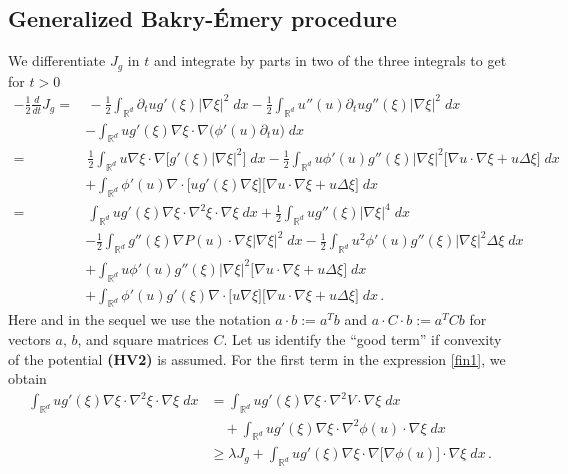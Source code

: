 \documentclass[reqno]{amsart}
\newcommand{\R}{\mathbb{R}}
\begin{document}
\subsection{Generalized Bakry-\'Emery procedure}\label{sec:4.1}
%
We differentiate $J_g$ in $t$ and integrate by parts in two of the three integrals to get for $t>0$
\begin{align}
  -\frac12\frac{d}{dt} J_g 
  =&\, -\frac12\int_{\R^d} \partial_tu g'(\xi)|\nabla\xi|^2 \;dx
  - \frac12\int_{\R^d} u''(u)\partial_t u g''(\xi)|\nabla\xi|^2 \;dx\nonumber\\
  &- \int_{\R^d} ug'(\xi)\nabla\xi\cdot\nabla\big(\phi'(u)\partial_tu\big) \;dx\nonumber\\
  = &\, \frac12\int_{\R^d} u\nabla\xi\cdot\nabla\big[g'(\xi)|\nabla\xi|^2\big] \;dx - \frac12\int_{\R^d} u\phi'(u)g''(\xi)|\nabla\xi|^2\big[\nabla u\cdot\nabla\xi + u\Delta\xi\big] \;dx\nonumber\\
  &+ \int_{\R^d} \phi'(u)\nabla\cdot\big[ug'(\xi)\nabla\xi\big]\big[\nabla u\cdot\nabla\xi + u\Delta\xi\big]\;dx\nonumber\\
  =&\, \int_{\R^d} ug'(\xi)\nabla\xi\cdot\nabla^2\xi \cdot \nabla\xi \;dx
  + \frac12 \int_{\R^d} ug''(\xi)|\nabla\xi|^4 \;dx\nonumber\\
  & -\frac12\int_{\R^d} g''(\xi)\nabla P(u)\cdot\nabla\xi|\nabla\xi|^2 \;dx- \frac12\int_{\R^d} u^2\phi'(u)g''(\xi)|\nabla\xi|^2\Delta\xi \;dx\nonumber\\
  & + \int_{\R^d} u\phi'(u)g''(\xi)|\nabla\xi|^2\big[\nabla u\cdot\nabla\xi + u\Delta\xi\big]\;dx\nonumber\\
& + \int_{\R^d} \phi'(u)g'(\xi)\nabla\cdot\big[u\nabla\xi\big]\big[\nabla u\cdot\nabla\xi + u\Delta\xi\big]\;dx\,.
\label{fin1}  
\end{align}
Here and in the sequel we use the notation $a\cdot b:=a^Tb$ and $a\cdot C \cdot b:=a^T C b$ for vectors $a,\,b$, and square matrices $C$.
Let us identify the ``good term'' if convexity of the potential {\bf (HV2)} is assumed.
For the first term in the expression \eqref{fin1}, we obtain
\begin{equation}
  \label{eq:nonopt}
  \begin{split}
    \int_{\R^d} ug'(\xi)\nabla\xi\cdot\nabla^2\xi\cdot \nabla\xi \;dx
    &= \int_{\R^d} ug'(\xi)\nabla\xi\cdot\nabla^2 V \cdot \nabla\xi \;dx\\
    &\quad+ \int_{\R^d} ug'(\xi)\nabla\xi\cdot\nabla^2\phi(u)\cdot\nabla\xi \;dx\\
    &\ge \lambda J_g + \int_{\R^d} ug'(\xi)\nabla\xi\cdot\nabla\big[\nabla \phi(u)\big]\cdot\nabla\xi \;dx\,.
  \end{split}
\end{equation}
\end{document}
